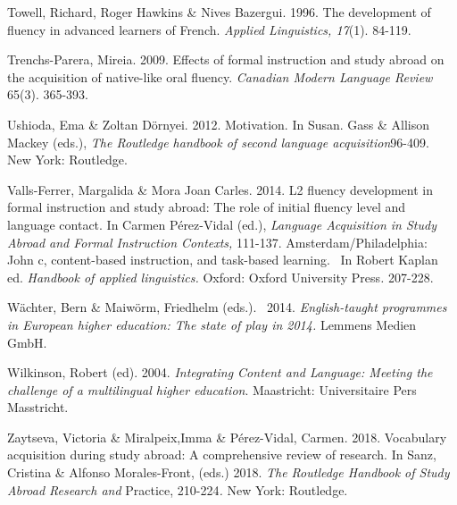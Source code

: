 \begin{styleStandard}
Towell, Richard, Roger Hawkins \& Nives Bazergui. 1996. The development of fluency in advanced learners of French. \textit{Applied Linguistics, 17}(1). 84-119. 
\end{styleStandard}


\begin{styleStandard}
Trenchs-Parera, Mireia. 2009. Effects of formal instruction and study abroad on the acquisition of native-like oral fluency. \textit{Canadian Modern Language Review} 65(3). 365-393.
\end{styleStandard}


\begin{styleStandard}
Ushioda, Ema \& Zoltan Dörnyei. 2012. Motivation. In Susan. Gass \& Allison Mackey (eds.), \emph{The Routledge handbook of second language acquisition}\textstyleappleconvertedspace{, }96-409. New York: Routledge.
\end{styleStandard}


\begin{styleStandard}
Valls-Ferrer, Margalida \& Mora Joan Carles. 2014. L2 fluency development in formal instruction and study abroad: The role of initial fluency level and language contact. In Carmen Pérez-Vidal (ed.), \textit{Language Acquisition in Study Abroad and Formal Instruction Contexts, }111-137. Amsterdam/Philadelphia: John c, content-based instruction, and task-based learning. ~In Robert Kaplan ed. \textit{Handbook of applied linguistics. }Oxford: Oxford University Press\textit{.} 207-228.
\end{styleStandard}


\begin{styleStandard}
Wächter, Bern \& Maiwörm, Friedhelm (eds.). \ 2014. \textit{English-taught programmes in European higher education: The state of play in 2014. }Lemmens Medien GmbH.
\end{styleStandard}


\begin{styleStandard}
Wilkinson, Robert (ed). 2004. \textit{Integrating Content and Language: Meeting the challenge of a multilingual higher education}. Maastricht: Universitaire Pers Masstricht. 
\end{styleStandard}


\begin{styleStandard}
Zaytseva, Victoria \& Miralpeix,Imma \& Pérez-Vidal, Carmen. 2018. Vocabulary acquisition during study abroad: A comprehensive review of research. In Sanz, Cristina \& Alfonso Morales-Front, (eds.) 2018. \textit{The Routledge Handbook of Study Abroad Research and }Practice, 210-224\textit{. }New York: Routledge. 
\end{styleStandard}


